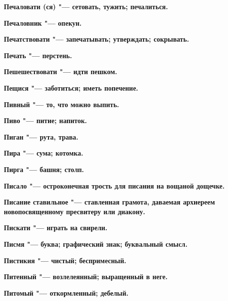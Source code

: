 \begin{multicols}{2}
\bfseries Печаловати\normalfont{} (ся) "--- сетовать, тужить; печалиться. 




\bfseries Печаловник\normalfont{} "--- опекун. 




\bfseries Печатствовати\normalfont{} "--- запечатывать; утверждать; сокрывать. 




\bfseries Печать\normalfont{} "--- перстень. 




\bfseries Пешешествовати\normalfont{} "--- идти пешком. 




\bfseries Пещися\normalfont{} "--- заботиться; иметь попечение. 




\bfseries Пивный\normalfont{} "--- то, что можно выпить. 




\bfseries Пиво\normalfont{} "--- питие; напиток. 




\bfseries Пиган\normalfont{} "--- рута, трава. 




\bfseries Пира\normalfont{} "--- сума; котомка. 




\bfseries Пирга\normalfont{} "--- башня; столп. 




\bfseries Писало\normalfont{} "--- остроконечная трость для писания на вощаной дощечке. 




\bfseries Писание ставильное\normalfont{} "--- ставленная грамота, даваемая архиереем новопосвященному пресвитеру или диакону. 




\bfseries Пискати\normalfont{} "--- играть на свирели. 




\bfseries Писмя\normalfont{} "--- буква; графический знак; буквальный смысл. 




\bfseries Пистикия\normalfont{} "--- чистый; беспримесный. 




\bfseries Питенный\normalfont{} "--- возлелеянный; выращенный в неге. 




\bfseries Питомый\normalfont{} "--- откормленный; дебелый. 





\end{multicols}

